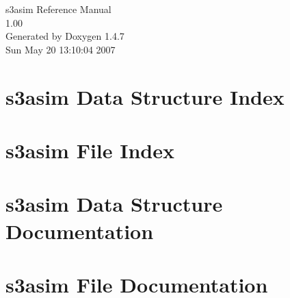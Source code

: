 \documentclass[a4paper]{book}
\begin{document}
\begin{titlepage}
\vspace*{7cm}
\begin{center}
{\Large s3asim Reference Manual\\[1ex]\large 1.00 }\\
\vspace*{1cm}
{\large Generated by Doxygen 1.4.7}\\
\vspace*{0.5cm}
{\small Sun May 20 13:10:04 2007}\\
\end{center}
\end{titlepage}
\clearemptydoublepage
{}
\tableofcontents
\clearemptydoublepage
{}
\chapter{s3asim Data Structure Index}

\chapter{s3asim File Index}

\chapter{s3asim Data Structure Documentation}













\chapter{s3asim File Documentation}
























\printindex
\end{document}
